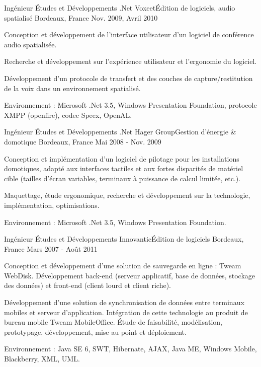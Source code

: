 \begin{cventries}
  \cventry
    {Ingénieur Études et Développements .Net}
    {Voxeet{\enskip\cdotp\enskip}Édition de logiciels, audio spatialisé}
    {Bordeaux, France}
    {Nov. 2009, Avril 2010}
    {
      \begin{cvitems}
        \item {Conception et développement de l'interface utilisateur d'un logiciel de conférence audio spatialisée.}
        \item {Recherche et développement sur l'expérience utilisateur et l'ergonomie du logiciel.}
        \item {Développement d'un protocole de transfert et des couches de capture/restitution de la voix dans un environnement spatialisé.}
        \item {Environnement : Microsoft .Net 3.5, Windows Presentation Foundation, protocole XMPP (openfire), codec Speex, OpenAL.}
      \end{cvitems}
    }

  \cventry
    {Ingénieur Études et Développements .Net}
    {Hager Group{\enskip\cdotp\enskip}Gestion d'énergie \& domotique}
    {Bordeaux, France}
    {Mai 2008 - Nov. 2009}
    {
      \begin{cvitems}
        \item {Conception et implémentation d'un logiciel de pilotage pour les installations domotiques, adapté aux interfaces tactiles et aux fortes disparités de matériel cible (tailles d'écran variables, terminaux à puissance de calcul limitée, etc.).}
        \item {Maquettage, étude ergonomique, recherche et développement sur la technologie,  implémentation, optimisations.}
        \item {Environnement : Microsoft .Net 3.5, Windows Presentation Foundation.}
      \end{cvitems}
    }

  \cventry
    {Ingénieur Études et Développements}
    {Innovantic{\enskip\cdotp\enskip}Édition de logiciels}
    {Bordeaux, France}
    {Mars 2007 - Août 2011}
    {
      \begin{cvitems}
        \item {Conception et développement d'une solution de sauvegarde en ligne : Tweam WebDisk. Développement back-end (serveur applicatif, base de données, stockage des données) et front-end (client lourd et client riche).}
        \item {Développement d'une solution de synchronisation de données entre terminaux mobiles et serveur d'application. Intégration de cette technologie au produit de bureau mobile Tweam MobileOffice. Étude de faisabilité, modélisation, prototypage, développement, mise au point et déploiement.}
        \item {Environnement : Java SE 6, SWT, Hibernate, AJAX, Java ME, Windows Mobile, Blackberry, XML, UML.}
      \end{cvitems}
    }


\end{cventries}
